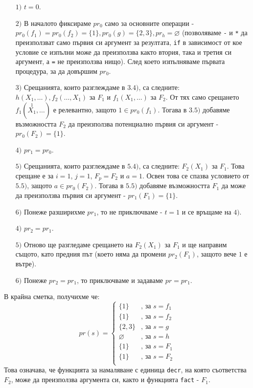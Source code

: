 \documentclass[12pt,twoside,a4paper]{article}
\begin{document}
	\begin{itemize}
		\item[$1)$] $t = 0$.
		\item[$2)$] В началото фиксираме $pr_0$ само за основните операции - $pr_0(f_1) = pr_0(f_2) = \{1\}, pr_0(g) = \{2, 3\}, pr_h = \varnothing$ (позволяваме \texttt{-} и \texttt{*} да преизползват само първия си аргумент за резултата, \texttt{if} в зависимост от кое условие се изпълни може да преизползва както втория, така и третия си аргумент, а \texttt{=} не преизползва нищо). След което изпълняваме първата процедура, за да довършим $pr_0$.
		\item[$3)$] Срещанията, които разглеждаме в $3.4)$, са следните: $h(X_1,\dots), f_2(\dots,X_1)$ за $F_1$ и $f_1(X_1,\dots)$ за $F_2$. От тях само срещането $f_1(\overset{1}{X_1},\dots)$ е релевантно, защото $1 \in pr_0(f_1)$. Тогава в $3.5)$ добавяме възможността $F_2$ да преизползва потенциално първия си аргумент - $pr_0(F_2)=\{1\}$. 
		\item[$4)$] $pr_1 = pr_0$.
		\item[$5)$] Срещанията, които разглеждаме в $5.4)$, са следните: $F_2(X_1)$ за $F_1$. Това срещане е за $i=1$, $j=1$, $F_p=F_2$ и $a=1$. Освен това се спазва условието от $5.5)$, защото $a \in pr_0(F_2)$. Тогава в $5.5)$ добавяме възможността $F_1$ да може да преизползва първия си аргумент - $pr_1(F_1)=\{1\}$.
		\item[$6)$] Понеже разширихме $pr_1$, то не приключваме - $t=1$ и се връщаме на $4)$.
		\item[$4)$] $pr_2 = pr_1$.
		\item[$5)$] Отново ще разгледаме срещането на $F_2(X_1)$ за $F_1$ и ще направим същото, като предния път (което няма да промени $pr_2(F_1)$, защото вече $1$ е вътре).
		\item[$6)$] Понеже $pr_2 = pr_1$, то приключваме и задаваме $pr = pr_1$.
	\end{itemize}
	В крайна сметка, получихме че:
	\begin{equation*}
		pr(s) =
		\begin{cases}
			\{1\} &\text{, за }s = f_1\\
			\{1\} &\text{, за }s = f_2\\
			\{2, 3\} &\text{, за }s = g\\
			\varnothing &\text{, за }s = h\\
			\{1\} &\text{, за }s = F_1\\
			\{1\} &\text{, за }s = F_2\\
		\end{cases}
	\end{equation*}
	Това означава, че функцията за намаляване с единица \texttt{decr}, на която съответства $F_2$, може да преизползва аргумента си, както и функцията \texttt{fact} - $F_1$.
	\finexample
	
\end{document}
